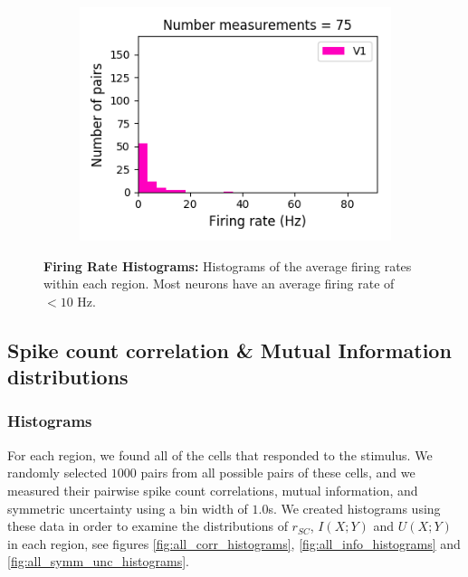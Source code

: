\documentclass[a4paper,12pt]{article}
\theoremstyle{definition}
\begin{document}
\begin{figure}[p]
\begin{subfigure}{0.5\textwidth}
    \includegraphics[width=\textwidth]{figures/all_v1_8_1p0_firing_rate_histogram.png}
  \end{subfigure}
  \caption{\textbf{Firing Rate Histograms:} Histograms of the average firing rates within each region. Most neurons have an average firing rate of $< 10$ Hz.}
  \label{fig:firing_rate_histograms}
\end{figure}

\subsection{Spike count correlation \& Mutual Information distributions}

\subsubsection{Histograms}\label{sec:histograms}
For each region, we found all of the cells that responded to the stimulus. We randomly selected $1000$ pairs from all possible pairs of these cells, and we measured their pairwise spike count correlations, mutual information, and symmetric uncertainty using a bin width of $1.0$s. We created histograms using these data in order to examine the distributions of $r_{SC}$, $I(X;Y)$ and $U(X;Y)$ in each region, see figures \ref{fig:all_corr_histograms}, \ref{fig:all_info_histograms} and \ref{fig:all_symm_unc_histograms}.
\end{document}

